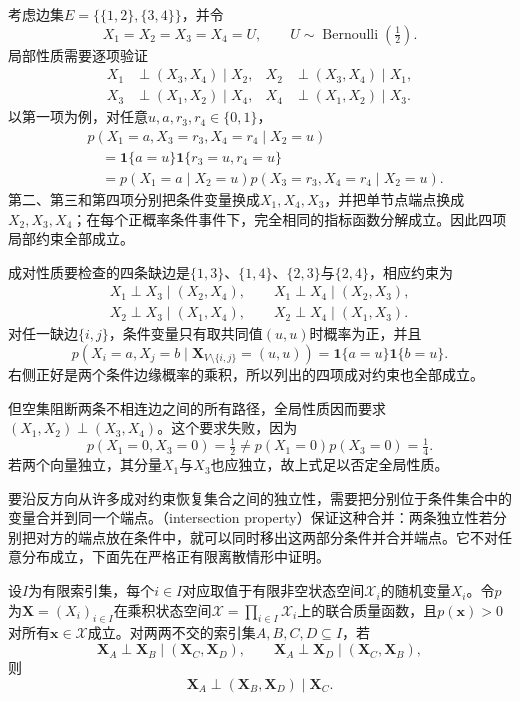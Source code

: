 \begin{example}[局部、成对均不蕴含全局]
  \label{ex:pgm-undirected-local-not-global}
  考虑边集$E=\{\{1,2\},\{3,4\}\}$，并令
  \[
    X_1=X_2=X_3=X_4=U,
    \qquad U\sim\operatorname{Bernoulli}(\tfrac12).
  \]
  局部性质需要逐项验证
  \[
  \begin{aligned}
    X_1&\perp(X_3,X_4)\mid X_2,&
    X_2&\perp(X_3,X_4)\mid X_1,\\
    X_3&\perp(X_1,X_2)\mid X_4,&
    X_4&\perp(X_1,X_2)\mid X_3.
  \end{aligned}
  \]
  以第一项为例，对任意$u,a,r_3,r_4\in\{0,1\}$，
  \[
  \begin{aligned}
    &p(X_1=a,X_3=r_3,X_4=r_4\mid X_2=u)\\
    &\quad=\mathbf{1}\{a=u\}
            \mathbf{1}\{r_3=u,r_4=u\}\\
    &\quad=p(X_1=a\mid X_2=u)
            p(X_3=r_3,X_4=r_4\mid X_2=u).
  \end{aligned}
  \]
  第二、第三和第四项分别把条件变量换成$X_1,X_4,X_3$，并把单节点端点换成$X_2,X_3,X_4$；在每个正概率条件事件下，完全相同的指标函数分解成立。因此四项局部约束全部成立。

  成对性质要检查的四条缺边是$\{1,3\}$、$\{1,4\}$、$\{2,3\}$与$\{2,4\}$，相应约束为
  \[
  \begin{gathered}
    X_1\perp X_3\mid(X_2,X_4),\qquad
    X_1\perp X_4\mid(X_2,X_3),\\
    X_2\perp X_3\mid(X_1,X_4),\qquad
    X_2\perp X_4\mid(X_1,X_3).
  \end{gathered}
  \]
  对任一缺边$\{i,j\}$，条件变量只有取共同值$(u,u)$时概率为正，并且
  \[
    p(X_i=a,X_j=b\mid\bm{X}_{V\setminus\{i,j\}}=(u,u))
    =\mathbf{1}\{a=u\}\mathbf{1}\{b=u\}.
  \]
  右侧正好是两个条件边缘概率的乘积，所以列出的四项成对约束也全部成立。

  但空集阻断两条不相连边之间的所有路径，全局性质因而要求$(X_1,X_2)\perp(X_3,X_4)$。这个要求失败，因为
  \[
    p(X_1=0,X_3=0)=\tfrac12
    \neq p(X_1=0)p(X_3=0)=\tfrac14.
  \]
  若两个向量独立，其分量$X_1$与$X_3$也应独立，故上式足以否定全局性质。
\end{example}

要沿反方向从许多成对约束恢复集合之间的独立性，需要把分别位于条件集合中的变量合并到同一个端点。（intersection property）保证这种合并：两条独立性若分别把对方的端点放在条件中，就可以同时移出这两部分条件并合并端点。它不对任意分布成立，下面先在严格正有限离散情形中证明。

\begin{lemma}[严格正分布的交集性质]
  \label{lem:pgm-undirected-intersection}
  设$I$为有限索引集，每个$i\in I$对应取值于有限非空状态空间$\mathcal{X}_i$的随机变量$X_i$。令$p$为$\bm{X}=(X_i)_{i\in I}$在乘积状态空间$\mathcal{X}=\prod_{i\in I}\mathcal{X}_i$上的联合质量函数，且$p(\bm{x})>0$对所有$\bm{x}\in\mathcal{X}$成立。对两两不交的索引集$A,B,C,D\subseteq I$，若
  \[
    \bm{X}_A\perp\bm{X}_B\mid(\bm{X}_C,\bm{X}_D),
    \qquad
    \bm{X}_A\perp\bm{X}_D\mid(\bm{X}_C,\bm{X}_B),
  \]
  则
  \[
    \bm{X}_A\perp(\bm{X}_B,\bm{X}_D)\mid\bm{X}_C.
  \]
\end{lemma}

